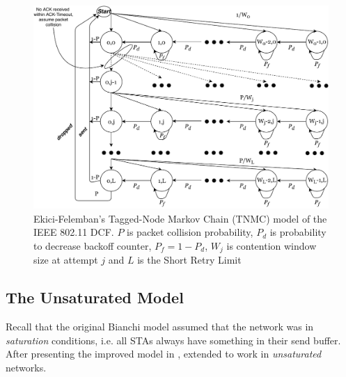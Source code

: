 \begin{figure}
\center
\includegraphics[width=1\textwidth]{images/tnmc-dcf.pdf}
\caption{Ekici-Felemban's Tagged-Node Markov Chain (TNMC) model of the IEEE 802.11 DCF. $P$ is packet collision probability, $P_d$ is probability to decrease backoff counter, $P_f = 1 - P_d$, $W_j$ is contention window size at attempt $j$ and $L$ is the Short Retry Limit}
\label{fig:tnmc}
\end{figure}

\subsection{The Unsaturated Model}

Recall that the original Bianchi model assumed that the network was in
\emph{saturation} conditions, i.e. all STAs always have something in their
send buffer. After presenting the improved model in \cite{felemban}, 
extended to work in \emph{unsaturated} networks.